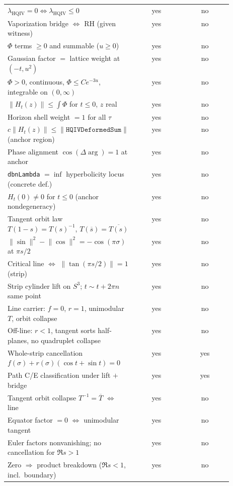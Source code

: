 \documentclass[11pt]{amsart}
\begin{document}
\begin{table}[h]
\begin{tabular}{@{}p{0.52\linewidth}cc@{}}
$\lambda_{\mathrm{HQIV}}=0\Leftrightarrow\lambda_{\mathrm{HQIV}}\le0$ & yes & no \\
Vaporization bridge $\Leftrightarrow$ RH (given witness) & yes & no \\
$\Phi$ terms $\ge0$ and summable ($u\ge0$) & yes & no \\
Gaussian factor $=$ lattice weight at $(-t,u^2)$ & yes & no \\
$\Phi>0$, continuous, $\Phi\le Ce^{-3u}$, integrable on $(0,\infty)$ & yes & no \\
$\lVert H_t(z)\rVert\le\int\Phi$ for $t\le0$, $z$ real & yes & no \\
Horizon shell weight $=1$ for all $\tau$ & yes & no \\
$c\lVert H_t(z)\rVert\le\lVert\texttt{HQIVDeformedSum}\rVert$ (anchor region) & yes & no \\
Phase alignment $\cos(\Delta\arg)=1$ at anchor & yes & no \\
\texttt{dbnLambda} $=\inf$ hyperbolicity locus (concrete def.) & yes & no \\
$H_t(0)\ne0$ for $t\le0$ (anchor nondegeneracy) & yes & no \\
Tangent orbit law $T(1-s)=T(s)^{-1}$, $T(\overline{s})=\overline{T(s)}$ & yes & no \\
$\lVert\sin\rVert^2-\lVert\cos\rVert^2=-\cos(\pi\sigma)$ at $\pi s/2$ & yes & no \\
Critical line $\Leftrightarrow$ $\lVert\tan(\pi s/2)\rVert=1$ (strip) & yes & no \\
Strip cylinder lift on $S^3$; $t\sim t+2\pi n$ same point & yes & no \\
Line carrier: $f=0$, $r=1$, unimodular $T$, orbit collapse & yes & no \\
Off-line: $r<1$, tangent sorts half-planes, no quadruplet collapse & yes & no \\
Whole-strip cancellation $f(\sigma)+r(\sigma)(\cos t+\sin t)=0$ & yes & yes \\
Path C/E classification under lift $+$ bridge & yes & yes \\
Tangent orbit collapse $T^{-1}=\overline{T}$ $\Leftrightarrow$ line & yes & no \\
Equator factor $=0$ $\Leftrightarrow$ unimodular tangent & yes & no \\
Euler factors nonvanishing; no cancellation for $\Re s>1$ & yes & no \\
Zero $\Rightarrow$ product breakdown ($\Re s<1$, incl.\ boundary) & yes & no \\

\end{tabular}
\end{table}
\end{document}
